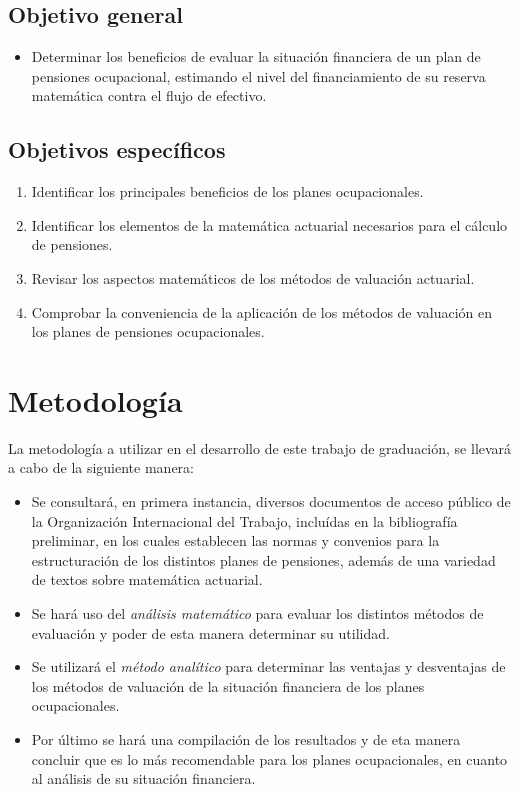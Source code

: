 \documentclass[12pt,letterpaper,titlepage]{article}
\begin{document}
\subsection{Objetivo general}

\begin{itemize}
	\item Determinar los beneficios de evaluar la situación financiera de un plan de pensiones ocupacional, estimando el nivel del financiamiento de su reserva matemática contra el flujo de efectivo.
\end{itemize}


\subsection{Objetivos específicos}

\begin{enumerate}
	\item Identificar los principales beneficios de los planes ocupacionales.
	\item Identificar los elementos de la matemática actuarial necesarios para el cálculo de pensiones.
	\item Revisar los aspectos matemáticos de los métodos de valuación actuarial.
	\item Comprobar la conveniencia de la aplicación de los métodos de valuación en los planes de pensiones ocupacionales. 
\end{enumerate}

\newpage

\section{Metodología}

La metodología a utilizar en el desarrollo de este trabajo de graduación, se llevará a cabo de la siguiente manera:

\begin{itemize}
	\item Se consultará, en primera instancia, diversos documentos de acceso público de la Organización Internacional del Trabajo, incluídas en la bibliografía preliminar,  en los cuales establecen las normas y convenios para la estructuración de los distintos planes de pensiones, además de una variedad de textos sobre matemática actuarial.
	
	\item Se hará uso del \textit{análisis matemático} para evaluar los distintos métodos de evaluación y poder de esta manera determinar su utilidad.
	 
	\item Se utilizará el \textit{método analítico} para determinar las ventajas y desventajas de los métodos de valuación de la situación financiera de los planes ocupacionales.
	
	\item Por último se hará una compilación de los resultados y de eta manera concluir que es lo más recomendable para los planes ocupacionales, en cuanto al análisis de su situación financiera.
\end{itemize}
\end{document}
